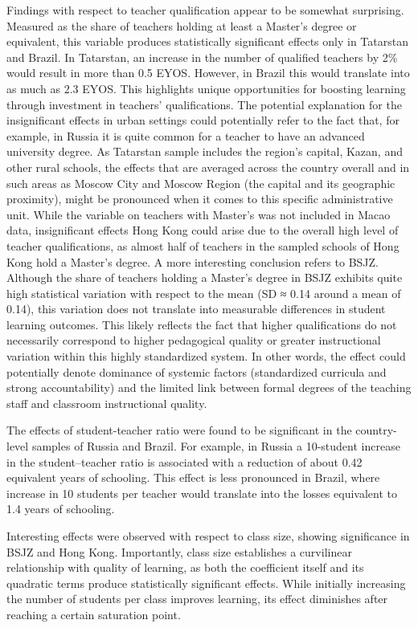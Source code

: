 \documentclass[
]{article}
\begin{document}
Findings with respect to teacher qualification appear to be somewhat
surprising. Measured as the share of teachers holding at least a
Master's degree or equivalent, this variable produces statistically
significant effects only in Tatarstan and Brazil. In Tatarstan, an
increase in the number of qualified teachers by 2\% would result in more
than 0.5 EYOS. However, in Brazil this would translate into as much as
2.3 EYOS. This highlights unique opportunities for boosting learning
through investment in teachers' qualifications. The potential
explanation for the insignificant effects in urban settings could
potentially refer to the fact that, for example, in Russia it is quite
common for a teacher to have an advanced university degree. As Tatarstan
sample includes the region's capital, Kazan, and other rural schools,
the effects that are averaged across the country overall and in such
areas as Moscow City and Moscow Region (the capital and its geographic
proximity), might be pronounced when it comes to this specific
administrative unit. While the variable on teachers with Master's was
not included in Macao data, insignificant effects Hong Kong could arise
due to the overall high level of teacher qualifications, as almost half
of teachers in the sampled schools of Hong Kong hold a Master's degree.
A more interesting conclusion refers to BSJZ. Although the share of
teachers holding a Master's degree in BSJZ exhibits quite high
statistical variation with respect to the mean (SD ≈ 0.14 around a mean
of 0.14), this variation does not translate into measurable differences
in student learning outcomes. This likely reflects the fact that higher
qualifications do not necessarily correspond to higher pedagogical
quality or greater instructional variation within this highly
standardized system. In other words, the effect could potentially denote
dominance of systemic factors (standardized curricula and strong
accountability) and the limited link between formal degrees of the
teaching staff and classroom instructional quality.

The effects of student-teacher ratio were found to be significant in the
country-level samples of Russia and Brazil. For example, in Russia a
10-student increase in the student--teacher ratio is associated with a
reduction of about 0.42 equivalent years of schooling. This effect is
less pronounced in Brazil, where increase in 10 students per teacher
would translate into the losses equivalent to 1.4 years of schooling.

Interesting effects were observed with respect to class size, showing
significance in BSJZ and Hong Kong. Importantly, class size establishes
a curvilinear relationship with quality of learning, as both the
coefficient itself and its quadratic terms produce statistically
significant effects. While initially increasing the number of students
per class improves learning, its effect diminishes after reaching a
certain saturation point.
\end{document}
